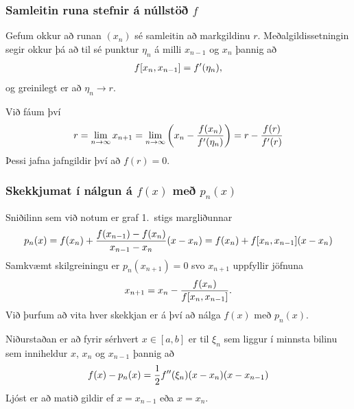 \documentclass[a4paper,10pt,icelandic]{sphinxmanual}
\begin{document}
\subsubsection{Samleitin runa stefnir á núllstöð \(f\)}
\label{kafli02:samleitin-runa-stefnir-a-nullsto}
Gefum okkur að runan \((x_n)\) sé samleitin að markgildinu
\(r\). Meðalgildissetningin segir okkur þá að til sé punktur
\(\eta_n\) á milli \(x_{n-1}\) og \(x_n\) þannig að
\begin{gather}
\begin{split}f[x_n,x_{n-1}]=f'(\eta_n),\end{split}\notag
\end{gather}
og greinilegt er að \(\eta_n\to r\).

Við fáum því
\begin{gather}
\begin{split}r=\lim_{n\to \infty}x_{n+1}=\lim_{n\to \infty}
\bigg(x_n-\dfrac{f(x_n)}{f'(\eta_n)}\bigg) =r-\dfrac{f(r)}{f'(r)}\end{split}\notag
\end{gather}
Þessi jafna jafngildir því að \(f(r)=0\).


\subsubsection{Skekkjumat í nálgun á \(f(x)\) með \(p_n(x)\)}
\label{kafli02:skekkjumat-i-nalgun-a-me}
Sniðilinn sem við notum er graf 1. stigs margliðunnar
\begin{gather}
\begin{split}p_n(x) = f(x_n) +
        \dfrac{f(x_{n-1})-f(x_n)}{x_{n-1}-x_n}(x-x_n)
        = f(x_n) + f[x_n,x_{n-1}](x-x_n)\end{split}\notag
\end{gather}
Samkvæmt skilgreiningu er \(p_n(x_{n+1}) = 0\) svo \(x_{n+1}\)
uppfyllir jöfnuna
\begin{gather}
\begin{split}x_{n+1} = x_n - \frac{f(x_n)}{f[x_n,x_{n-1}]}.\end{split}\notag
\end{gather}
Við þurfum að vita hver skekkjan er á því að nálga \(f(x)\) með
\(p_n(x)\).

Niðurstaðan er að fyrir sérhvert \(x \in [a,b]\) er til
\(\xi_n\) sem liggur í minnsta bilinu sem inniheldur \(x\),
\(x_n\) og \(x_{n-1}\) þannig að
\begin{gather}
\begin{split}f(x) - p_n(x) = \frac{1}{2}f''(\xi_n)(x-x_n)(x-x_{n-1})\end{split}\notag
\end{gather}
Ljóst er að matið gildir ef \(x=x_{n-1}\) eða \(x=x_n\).
\end{document}
